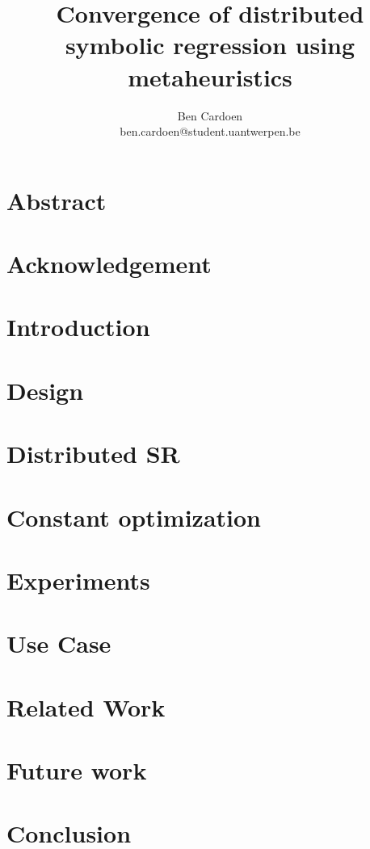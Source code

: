\documentclass[]{article}
\title{Convergence of distributed symbolic regression using metaheuristics
    }
\author{
    Ben Cardoen  \\
    ben.cardoen@student.uantwerpen.be
}
\begin{document}
    
    \maketitle
    \section{Abstract}
    
    \newpage
    
    \section{Acknowledgement}
    
    \newpage
    
    \tableofcontents
    
    \newpage
    \section{Introduction}
    
    \section{Design}\label{secdesign}
    
    \section{Distributed SR}\label{secdistributed}
    
    \section{Constant optimization}\label{secconstopt}
    
    \section{Experiments}\label{secexperiments}
    
    \section{Use Case}\label{secusecase}
    
    \section{Related Work}
    
	\section{Future work}
    
    \section{Conclusion}
    
    \newpage
	\listoffigures
	\newpage
    \listoftables
    \newpage
    
    
    
\end{document}
